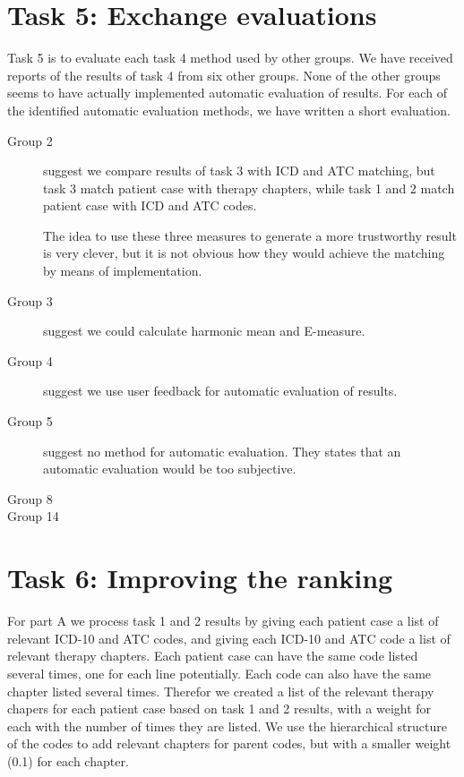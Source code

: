 \section{Task 5: Exchange evaluations}
Task 5 is to evaluate each task 4 method used by other groups.
We have received reports of the results of task 4 from six other groups. 
None of the other groups seems to have actually implemented automatic
evaluation of results. For each of the identified automatic evaluation methods, we have written a short evaluation.

\begin{description}
	\item[Group 2] suggest we compare results of task 3 with ICD and ATC
		matching, but task 3 match patient case with therapy chapters, while
		task 1 and 2 match patient case with ICD and ATC codes. 

The idea to use these three measures to generate a more trustworthy result is very clever, but it is not
		obvious how they would achieve the matching by means of implementation.
	\item[Group 3] suggest we could calculate harmonic mean and E-measure.
	\item[Group 4] suggest we use user feedback for automatic evaluation of
		results.
	\item[Group 5] suggest no method for automatic evaluation. They states that an automatic evaluation would be too subjective.
	\item[Group 8] 
	\item[Group 14]
\end{description}


\section{Task 6: Improving the ranking}
For part A we process task 1 and 2 results by giving each patient case a list
of relevant ICD-10 and ATC codes, and giving each ICD-10 and ATC code a list
of relevant therapy chapters. Each patient case can have the same code listed
several times, one for each line potentially. Each code can also have the same
chapter listed several times. Therefor we created a list of the relevant
therapy chapers for each patient case based on task 1 and 2 results, with a
weight for each with the number of times they are listed. We use the
hierarchical structure of the codes to add relevant chapters for parent codes,
but with a smaller weight (0.1) for each chapter.

